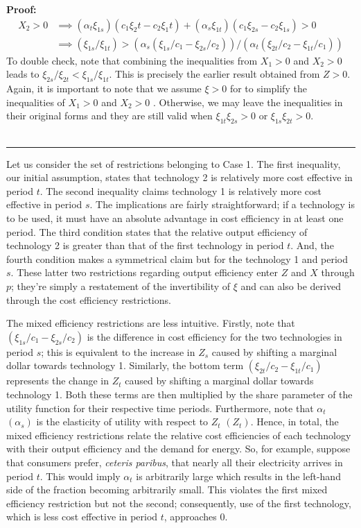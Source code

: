 \documentclass[11pt,a4paper,leqno]{extarticle}
\newenvironment{proof}[1][Proof]{\noindent\textbf{#1:} }{\ \rule{0.5em}{0.5em}}
\begin{document}
\begin{proof}
		\begin{align*}
		X_2 > 0 &\implies (\alpha_t \xi_{1s})(c_1 \xi_2t - c_2\xi_1t) + (\alpha_s \xi_{1t})(c_1 \xi_{2s} - c_2 \xi_{1s}) > 0\\
		&\implies (\xi_{1s}/\xi_{1t}) > (\alpha_s (\xi_{1s}/c_1 -  \xi_{2s}/c_2))/(\alpha_t(\xi_{2t}/c_2 - \xi_{1t}/c_1)) 
		\end{align*}
		To double check, note that combining the inequalities from $X_1>0$ and $X_2 > 0$ leads to $\xi_{2s}/\xi_{2t} < \xi_{1s}/\xi_{1t}$. This is precisely the earlier result obtained from $Z > 0$. Again, it is  important to note that we assume $\xi > 0$ for to simplify the inequalities of $X_1 > 0$ and $X_2 > 0$ . Otherwise, we may leave the inequalities in their original forms and they are still valid when  $\xi_{1t} \xi_{2s} > 0$ or $\xi_{1s} \xi_{2t} > 0$.   \\ \hfill
	\end{proof}
	
	Let us consider the set of restrictions belonging to Case 1. The first inequality, our initial assumption, states that technology 2 is relatively more cost effective in period $t$. The second inequality claims technology 1 is relatively more cost effective in period $s$. The implications are fairly straightforward; if a technology is to be used, it must have an absolute advantage in cost efficiency in at least one period. The third condition states that the relative output efficiency of technology 2 is greater than that of the first technology in period $t$. And, the fourth condition makes a symmetrical claim but for the technology 1 and period $s$. These latter two restrictions regarding output efficiency enter $Z$ and $X$ through $p$; they're simply a restatement of the invertibility of $\xi$ and can also be derived through the cost efficiency restrictions. 
	
	The mixed efficiency restrictions are less intuitive. Firstly, note that $\left(\xi_{1s}/c_1 - \xi_{2s}/c_2\right)$ is the difference in cost efficiency for the two technologies in period $s$; this is equivalent to the increase in $Z_s$ caused by shifting a marginal dollar towards technology 1. Similarly, the bottom term $\left( \xi_{2t}/c_2 - \xi_{1t}/c_1 \right)$ represents the change in $Z_t$ caused by shifting a marginal dollar towards technology 1. Both these terms are then multiplied by the share parameter of the utility function for their respective time periods. Furthermore, note that $\alpha_t$ $(\alpha_s)$ is the elasticity of utility with respect to $Z_t$ $(Z_t)$. Hence, in total, the mixed efficiency restrictions relate the relative cost efficiencies of each technology with their output efficiency and the demand for energy. So, for example, suppose that consumers prefer, \textit{ceteris paribus}, that nearly all their electricity arrives in period $t$. This would imply $\alpha_t$ is arbitrarily large which results in the left-hand side of the fraction becoming arbitrarily small. This violates the first mixed efficiency restriction but not the second; consequently, use of the first technology, which is less cost effective in period $t$, approaches $0$. 
	
\end{document}
